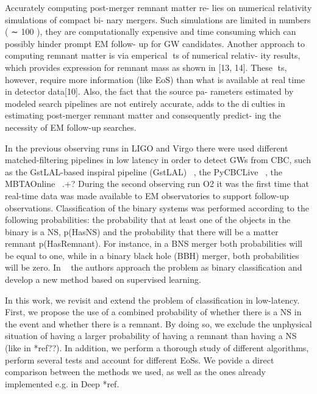 

Accurately computing post-merger remnant matter re-
lies on numerical relativity simulations of compact bi-
nary mergers. Such simulations are limited in numbers
( ∼ 100 ), they are computationally expensive and time
consuming which can possibly hinder prompt EM follow-
up for GW candidates. Another approach to computing
remnant matter is via emperical ts of numerical relativ-
ity results, which provides expression for remnant mass
as shown in [13, 14]. These ts, however, require more
information (like EoS) than what is available at real time
in detector data[10]. Also, the fact that the source pa-
rameters estimated by modeled search pipelines are not
entirely accurate, adds to the diculties in estimating
post-merger remnant matter and consequently predict-
ing the necessity of EM follow-up searches.
   
 
In the previous observing runs in LIGO and Virgo there were used different matched-filtering pipelines in low latency in order to detect GWs from CBC, such as the GstLAL-based inspiral pipeline (GstLAL) ~\cite{Sachdev:2020lfd}, the PyCBCLive ~\cite{Nitz_2018}, the MBTAOnline ~\cite{Adams_2016}.+? During the second observing run O2 it was the first time that real-time data was made available to EM observatories to support follow-up observations. Classification of the binary systems was performed according to the following probabilities: the probability that at least one of the objects in the binary is a NS, p(HasNS) and the probability that there will be a matter remnant p(HasRemnant). For instance, in a BNS merger both probabilities will be equal to one, while in a binary black hole (BBH) merger, both probabilities will be zero. In ~\cite{Chatterjee:2019avs} the authors approach the problem as binary classification and develop a new method based on supervised learning. 


In this work, we revisit and extend the problem of classification in low-latency. First, we propose the use of a combined probability of whether there is a NS in the event and whether there is a remnant. By doing so, we exclude the unphysical situation of having a larger probability of having a remnant than having a NS (like in *ref??). In addition, we perform a thorough study of different algorithms, perform several tests and account for different EoSs. We povide a direct comparison between the methods we used, as well as the ones already implemented e.g. in Deep *ref. 

